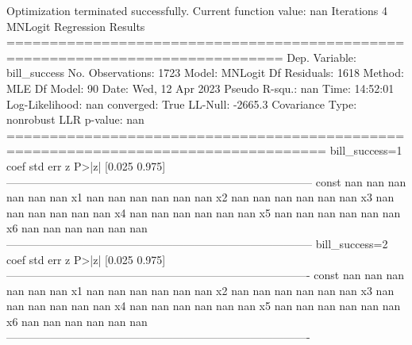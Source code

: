 \begin{pyprint}
Optimization terminated successfully.
         Current function value: nan
         Iterations 4
                          MNLogit Regression Results                          
==============================================================================
Dep. Variable:           bill_success   No. Observations:                 1723
Model:                        MNLogit   Df Residuals:                     1618
Method:                           MLE   Df Model:                           90
Date:                Wed, 12 Apr 2023   Pseudo R-squ.:                     nan
Time:                        14:52:01   Log-Likelihood:                    nan
converged:                       True   LL-Null:                       -2665.3
Covariance Type:            nonrobust   LLR p-value:                       nan
===================================================================================
 bill_success=1       coef    std err          z      P>|z|      [0.025      0.975]
-----------------------------------------------------------------------------------
const                  nan        nan        nan        nan         nan         nan
x1                     nan        nan        nan        nan         nan         nan
x2                     nan        nan        nan        nan         nan         nan
x3                     nan        nan        nan        nan         nan         nan
x4                     nan        nan        nan        nan         nan         nan
x5                     nan        nan        nan        nan         nan         nan
x6                     nan        nan        nan        nan         nan         nan
-----------------------------------------------------------------------------------
bill_success=2       coef    std err          z      P>|z|      [0.025      0.975]
----------------------------------------------------------------------------------
const                 nan        nan        nan        nan         nan         nan
x1                    nan        nan        nan        nan         nan         nan
x2                    nan        nan        nan        nan         nan         nan
x3                    nan        nan        nan        nan         nan         nan
x4                    nan        nan        nan        nan         nan         nan
x5                    nan        nan        nan        nan         nan         nan
x6                    nan        nan        nan        nan         nan         nan
----------------------------------------------------------------------------------

\end{pyprint}
